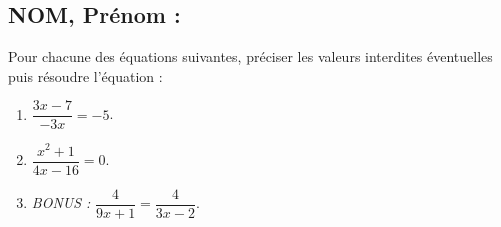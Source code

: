 \documentclass[a4paper,11pt,exos]{nsi}
\begin{document}
\subsection*{NOM, Prénom : \dotfill} 


\maketitle



\begin{exercice}
    Pour chacune des équations suivantes, préciser les valeurs interdites éventuelles puis résoudre l'équation :
    \begin{multicols}{3}
        \begin{enumerate}
            \item $\dfrac{3x-7}{-3x}=-5$.
	        \item $\dfrac{x^2+1}{4x-16}=0$.
	        \item  \textit{BONUS :} $\dfrac{4}{9x+1}=\dfrac{4}{3x-2}$.
        \end{enumerate}
    \end{multicols}
    
\end{exercice}

\end{document}
